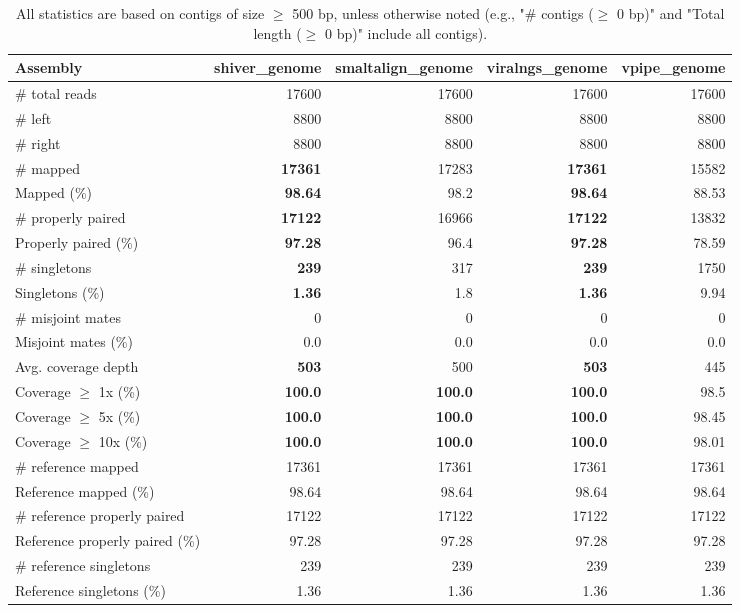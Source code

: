 \documentclass[12pt,a4paper]{article}
\begin{document}
\begin{table}[ht]
\begin{center}
\caption{All statistics are based on contigs of size $\geq$ 500 bp, unless otherwise noted (e.g., "\# contigs ($\geq$ 0 bp)" and "Total length ($\geq$ 0 bp)" include all contigs).}
\begin{tabular}{|l*{4}{|r}|}
\hline
Assembly & shiver\_genome & smaltalign\_genome & viralngs\_genome & vpipe\_genome \\ \hline
\# total reads & 17600 & 17600 & 17600 & 17600 \\ \hline
\# left & 8800 & 8800 & 8800 & 8800 \\ \hline
\# right & 8800 & 8800 & 8800 & 8800 \\ \hline
\# mapped & {\bf 17361} & 17283 & {\bf 17361} & 15582 \\ \hline
Mapped (\%) & {\bf 98.64} & 98.2 & {\bf 98.64} & 88.53 \\ \hline
\# properly paired & {\bf 17122} & 16966 & {\bf 17122} & 13832 \\ \hline
Properly paired (\%) & {\bf 97.28} & 96.4 & {\bf 97.28} & 78.59 \\ \hline
\# singletons & {\bf 239} & 317 & {\bf 239} & 1750 \\ \hline
Singletons (\%) & {\bf 1.36} & 1.8 & {\bf 1.36} & 9.94 \\ \hline
\# misjoint mates & 0 & 0 & 0 & 0 \\ \hline
Misjoint mates (\%) & 0.0 & 0.0 & 0.0 & 0.0 \\ \hline
Avg. coverage depth & {\bf 503} & 500 & {\bf 503} & 445 \\ \hline
Coverage $\geq$ 1x (\%) & {\bf 100.0} & {\bf 100.0} & {\bf 100.0} & 98.5 \\ \hline
Coverage $\geq$ 5x (\%) & {\bf 100.0} & {\bf 100.0} & {\bf 100.0} & 98.45 \\ \hline
Coverage $\geq$ 10x (\%) & {\bf 100.0} & {\bf 100.0} & {\bf 100.0} & 98.01 \\ \hline
\# reference mapped & 17361 & 17361 & 17361 & 17361 \\ \hline
Reference mapped (\%) & 98.64 & 98.64 & 98.64 & 98.64 \\ \hline
\# reference properly paired & 17122 & 17122 & 17122 & 17122 \\ \hline
Reference properly paired (\%) & 97.28 & 97.28 & 97.28 & 97.28 \\ \hline
\# reference singletons & 239 & 239 & 239 & 239 \\ \hline
Reference singletons (\%) & 1.36 & 1.36 & 1.36 & 1.36 \\ \hline

\end{tabular}
\end{center}
\end{table}
\end{document}
